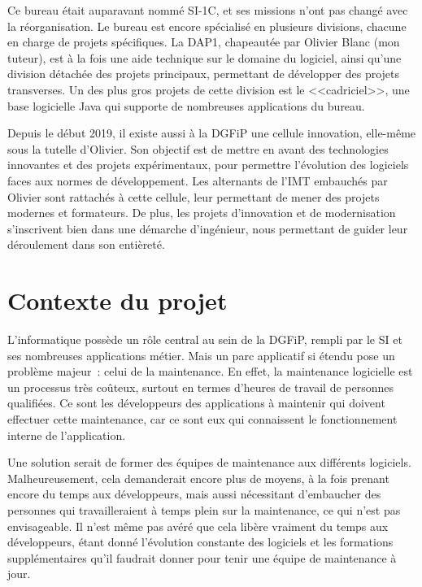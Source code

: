 \documentclass[openany, 11pt]{memoir}
\begin{document}
Ce bureau était auparavant nommé SI-1C, et ses missions n'ont pas changé avec la réorganisation. Le bureau est encore spécialisé en plusieurs divisions, chacune en charge de projets spécifiques. La \gls{DAP1}, chapeautée par Olivier Blanc (mon tuteur), est à la fois une aide technique sur le domaine du logiciel, ainsi qu'une division détachée des projets principaux, permettant de développer des projets \glspl{transverse}. Un des plus gros projets de cette division est le <<cadriciel>>, une base logicielle Java qui supporte de nombreuses applications du bureau.

\bigskip
Depuis le début 2019, il existe aussi à la DGFiP une cellule innovation, elle-même sous la tutelle d'Olivier. Son objectif est de mettre en avant des technologies innovantes et des projets expérimentaux, pour permettre l'évolution des logiciels faces aux normes de développement. Les alternants de l'IMT embauchés par Olivier sont rattachés à cette cellule, leur permettant de mener des projets modernes et formateurs. De plus, les projets d'innovation et de modernisation s'inscrivent bien dans une démarche d'ingénieur, nous permettant de guider leur déroulement dans son entièreté.

\newpage
\section{Contexte du projet}

L'informatique possède un rôle central au sein de la \gls{DGFiP}, rempli par le \gls{SI} et ses nombreuses applications métier. Mais un parc applicatif si étendu pose un problème majeur~: celui de la maintenance. En effet, la maintenance logicielle est un processus très coûteux, surtout en termes d'heures de travail de personnes qualifiées. Ce sont les développeurs des applications à maintenir qui doivent effectuer cette maintenance, car ce sont eux qui connaissent le fonctionnement interne de l'application.

Une solution serait de former des équipes de maintenance aux différents logiciels. Malheureusement, cela demanderait encore plus de moyens, à la fois prenant encore du temps aux développeurs, mais aussi nécessitant d'embaucher des personnes qui travailleraient à temps plein sur la maintenance, ce qui n'est pas envisageable. Il n'est même pas avéré que cela libère vraiment du temps aux développeurs, étant donné l'évolution constante des logiciels et les formations supplémentaires qu'il faudrait donner pour tenir une équipe de maintenance à jour.
\end{document}
